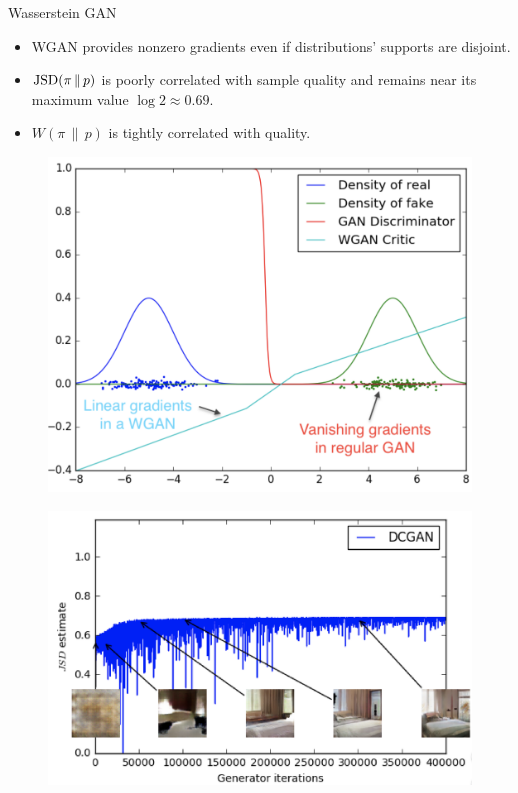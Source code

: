 \documentclass{beamer}
\begin{document}
\begin{frame}{Wasserstein GAN}
	\vspace{-0.3cm}
	
	\begin{minipage}[t]{0.6\columnwidth}
		\begin{itemize}
			\item WGAN provides nonzero gradients even if distributions' supports are disjoint.
			\item $\mathrm{JSD}(\pi\,\|\,p)$ is poorly correlated with sample quality and remains near its maximum value $\log 2 \approx 0.69$.
			\item $W(\pi\,\|\,p)$ is tightly correlated with quality.
		\end{itemize}
	\end{minipage}%
	\begin{minipage}[t]{0.4\columnwidth}
		\begin{figure}
			\centering
			\includegraphics[width=\linewidth]{figs/wgan_toy}
		\end{figure}
	\end{minipage}
	\begin{minipage}[t]{0.5\columnwidth}
		\begin{figure}
			\centering
			\includegraphics[width=0.95\linewidth]{figs/dcgan_quality}

\end{figure}
\end{minipage}
\end{frame}
\end{document}

